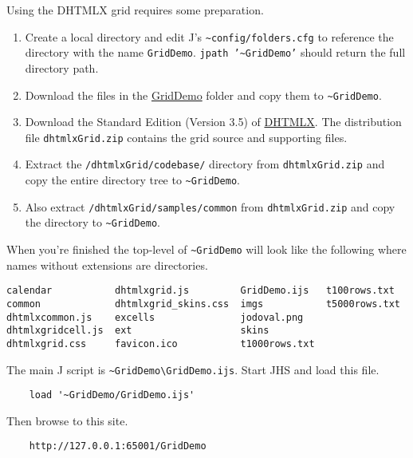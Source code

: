 Using the DHTMLX grid requires some preparation.

\begin{enumerate}
\item
  Create a local directory and edit J's
  \texttt{\textasciitilde{}config/folders.cfg} to reference the
  directory with the name \texttt{GridDemo}.
  \texttt{jpath '\textasciitilde{}GridDemo'} should return the full
  directory path.
\item
  Download the files in the
  \href{https://www.box.com/s/n7ty82nv6nslia4drphs}{GridDemo} folder and
  copy them to \texttt{\textasciitilde{}GridDemo}.
\item
  Download the Standard Edition (Version 3.5) of
  \href{http://dhtmlx.com/docs/products/dhtmlxGrid/index.shtml}{DHTMLX}.
  The distribution file \texttt{dhtmlxGrid.zip} contains the grid source
  and supporting files.
\item
  Extract the \texttt{/dhtmlxGrid/codebase/} directory from
  \texttt{dhtmlxGrid.zip} and copy the entire directory tree to
  \texttt{\textasciitilde{}GridDemo}.
\item
  Also extract \texttt{/dhtmlxGrid/samples/common} from
  \texttt{dhtmlxGrid.zip} and copy the directory to
  \texttt{\textasciitilde{}GridDemo}.
\end{enumerate}

When you're finished the top-level of \texttt{\textasciitilde{}GridDemo}
will look like the following where names without extensions are
directories.

\begin{verbatim}
calendar           dhtmlxgrid.js         GridDemo.ijs   t100rows.txt
common             dhtmlxgrid_skins.css  imgs           t5000rows.txt
dhtmlxcommon.js    excells               jodoval.png
dhtmlxgridcell.js  ext                   skins
dhtmlxgrid.css     favicon.ico           t1000rows.txt
\end{verbatim}

\noindent The main J script is
\texttt{\textasciitilde{}GridDemo\textbackslash{}GridDemo.ijs}. Start
JHS and load this file.

\begin{verbatim}
    load '~GridDemo/GridDemo.ijs'
\end{verbatim}

\noindent Then browse to this site.

\begin{verbatim}
    http://127.0.0.1:65001/GridDemo
\end{verbatim}

